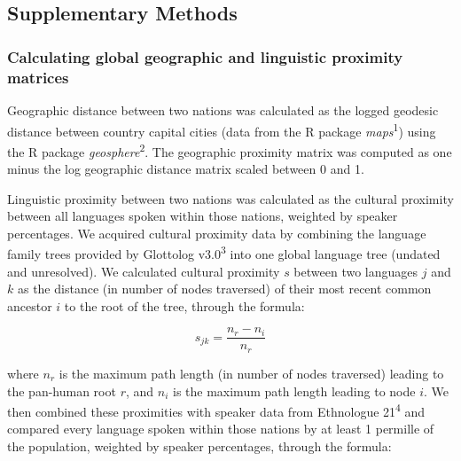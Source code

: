 \documentclass[
  english,
  man,floatsintext]{apa6}
\begin{document}
\begin{appendix}
\renewcommand{\appendixname}{\bf{Supplementary Material}}
\renewcommand{\figurename}{Supplementary Figure}
\renewcommand{\tablename}{Supplementary Table}
\renewcommand{\thefigure}{S\arabic{figure}} \setcounter{figure}{0}
\renewcommand{\thetable}{S\arabic{table}} \setcounter{table}{0}
\renewcommand{\theequation}{S\arabic{table}} \setcounter{equation}{0}

\hypertarget{section}{%
\section{}\label{section}}

\hypertarget{supplementary-methods}{%
\subsection{Supplementary Methods}\label{supplementary-methods}}

\hypertarget{calculating-global-geographic-and-linguistic-proximity-matrices}{%
\subsubsection{Calculating global geographic and linguistic proximity
matrices}\label{calculating-global-geographic-and-linguistic-proximity-matrices}}

Geographic distance between two nations was calculated as the logged
geodesic distance between country capital cities (data from the R
package \emph{maps}\textsuperscript{1}) using the R package
\emph{geosphere}\textsuperscript{2}. The geographic proximity matrix was
computed as one minus the log geographic distance matrix scaled between
0 and 1.

Linguistic proximity between two nations was calculated as the cultural
proximity between all languages spoken within those nations, weighted by
speaker percentages. We acquired cultural proximity data by combining
the language family trees provided by Glottolog v3.0\textsuperscript{3}
into one global language tree (undated and unresolved). We calculated
cultural proximity \(s\) between two languages \(j\) and \(k\) as the
distance (in number of nodes traversed) of their most recent common
ancestor \(i\) to the root of the tree, through the formula:

\[
s_{jk} = \frac{n_{r}-n_{i}}{n_{r}}
\]

where \(n_{r}\) is the maximum path length (in number of nodes
traversed) leading to the pan-human root \(r\), and \(n_{i}\) is the
maximum path length leading to node \(i\). We then combined these
proximities with speaker data from Ethnologue 21\textsuperscript{4} and
compared every language spoken within those nations by at least 1
permille of the population, weighted by speaker percentages, through the
formula:


\end{appendix}
\end{document}
